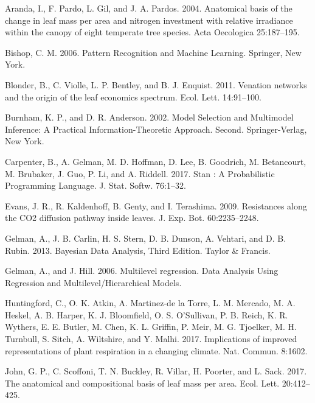 \documentclass[
  12pt,
]{article}
\newlength{\cslhangindent}
\newenvironment{cslreferences}%
  {\setlength{\parindent}{0pt}%
  \everypar{\setlength{\hangindent}{\cslhangindent}}\ignorespaces}%
  {\par}
\begin{document}
\hypertarget{refs}{}
\begin{cslreferences}
\leavevmode\hypertarget{ref-Aranda2004}{}%
Aranda, I., F. Pardo, L. Gil, and J. A. Pardos. 2004. Anatomical basis of the change in leaf mass per area and nitrogen investment with relative irradiance within the canopy of eight temperate tree species. Acta Oecologica 25:187--195.

\leavevmode\hypertarget{ref-Bishop2006}{}%
Bishop, C. M. 2006. Pattern Recognition and Machine Learning. Springer, New York.

\leavevmode\hypertarget{ref-Blonder2011}{}%
Blonder, B., C. Violle, L. P. Bentley, and B. J. Enquist. 2011. Venation networks and the origin of the leaf economics spectrum. Ecol. Lett. 14:91--100.

\leavevmode\hypertarget{ref-Burnham2002}{}%
Burnham, K. P., and D. R. Anderson. 2002. Model Selection and Multimodel Inference: A Practical Information-Theoretic Approach. Second. Springer-Verlag, New York.

\leavevmode\hypertarget{ref-Carpenter2017}{}%
Carpenter, B., A. Gelman, M. D. Hoffman, D. Lee, B. Goodrich, M. Betancourt, M. Brubaker, J. Guo, P. Li, and A. Riddell. 2017. Stan : A Probabilistic Programming Language. J. Stat. Softw. 76:1--32.

\leavevmode\hypertarget{ref-Evans2009}{}%
Evans, J. R., R. Kaldenhoff, B. Genty, and I. Terashima. 2009. Resistances along the CO2 diffusion pathway inside leaves. J. Exp. Bot. 60:2235--2248.

\leavevmode\hypertarget{ref-Gelman2013}{}%
Gelman, A., J. B. Carlin, H. S. Stern, D. B. Dunson, A. Vehtari, and D. B. Rubin. 2013. Bayesian Data Analysis, Third Edition. Taylor \& Francis.

\leavevmode\hypertarget{ref-Gelman2006}{}%
Gelman, A., and J. Hill. 2006. Multilevel regression. Data Analysis Using Regression and Multilevel/Hierarchical Models.

\leavevmode\hypertarget{ref-Huntingford2017}{}%
Huntingford, C., O. K. Atkin, A. Martinez-de la Torre, L. M. Mercado, M. A. Heskel, A. B. Harper, K. J. Bloomfield, O. S. O'Sullivan, P. B. Reich, K. R. Wythers, E. E. Butler, M. Chen, K. L. Griffin, P. Meir, M. G. Tjoelker, M. H. Turnbull, S. Sitch, A. Wiltshire, and Y. Malhi. 2017. Implications of improved representations of plant respiration in a changing climate. Nat. Commun. 8:1602.

\leavevmode\hypertarget{ref-John2017}{}%
John, G. P., C. Scoffoni, T. N. Buckley, R. Villar, H. Poorter, and L. Sack. 2017. The anatomical and compositional basis of leaf mass per area. Ecol. Lett. 20:412--425.


\end{cslreferences}
\end{document}
